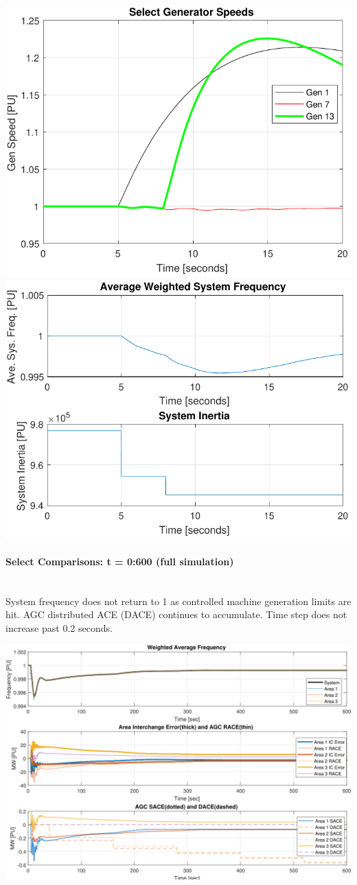 \documentclass[12pt]{article}
\begin{document}
\begin{center}
\includegraphics[width=.45\linewidth]{genTripSPD01}%
\includegraphics[width=.45\linewidth]{genTripFnH01}%
\end{center}


\pagebreak
\paragraph{Select Comparisons: t = 0:600 (full simulation)} \ \\
System frequency does not return to 1 as controlled machine generation limits are hit.
AGC distributed ACE (DACE) continues to accumulate.
Time step does not increase past 0.2 seconds.

\includegraphics[width=\linewidth]{agc}
\end{document}
